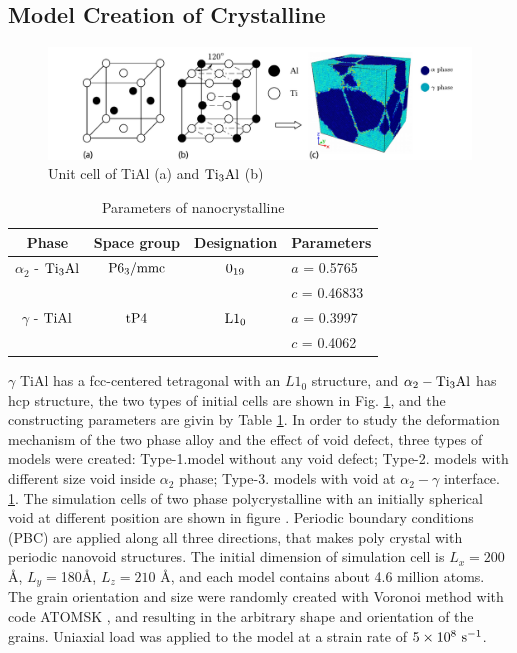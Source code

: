 \documentclass[metals,article,submit,moreauthors,pdftex,10pt,a4paper]{Definitions/mdpi}
\begin{document}
\subsection{Model Creation of Crystalline}
\begin{figure}[ht]
	\centering
	\includegraphics[width=1\linewidth]{img/tial-cell2}
	\caption{Unit cell of \rm{TiAl} (a) and $\rm{Ti_3Al}$ (b)}
	\label{fig:tial-cell}
\end{figure}

\begin{table}[ht]
	\caption{Parameters of nanocrystalline}
	\centering
	\begin{tabular}{c c c l}
	\toprule
	\textbf{Phase}			& {Space group}		& {Designation} 		& {Parameters} \\
	\midrule
	$\alpha_2$ - $\rm{Ti_3Al}$		& $\rm P6_3/mmc$ 	& $\rm 0_{19}$ 		& $a$ = 0.5765 \\
		&					&					& $c$ = 0.46833 \\
	$\gamma$ - $\rm{TiAl}$ 		& $\rm tP4$ 		& $\rm L1_0$		& $a$ = 0.3997 \\
		&					&					& $c$ = 0.4062 \\			
	\bottomrule
	\end{tabular} 
	\label{tab:lattice_parameter}
\end{table} 

$\gamma $ TiAl has a fcc-centered tetragonal with an $L1_0$ structure, and $\alpha_2 -\rm Ti_3Al$ has hcp structure, the two types of initial cells are shown in Fig. \ref{fig:tial-cell}, and the constructing parameters are givin by Table \ref{tab:lattice_parameter}. 
In order to study the deformation mechanism of the two phase alloy and the effect of void defect, three types of models were created: Type-1.model without any void defect; Type-2. models with different size void inside $\alpha_2$ phase; Type-3. models with void at $\alpha_2-\gamma$ interface. 
\ref{tab:lattice_parameter}. The simulation cells of two phase polycrystalline with an initially spherical void at different position are shown in figure . 
Periodic boundary conditions (PBC) are applied along all three directions, that makes poly crystal with periodic nanovoid structures. The initial dimension of simulation cell is $L_x =200$ \si{\angstrom}, $L_y = $180\si{\angstrom}, $L_z = 210$ \si{\angstrom}, and each model contains about 4.6 million atoms. The grain orientation and size were randomly created with Voronoi method with code ATOMSK \cite{Hirel2015}, and resulting in the arbitrary shape and orientation of the grains.
Uniaxial load was applied to the model at a strain rate of $5\times10^8\ \rm{s}^{-1}$.
 
\end{document}
